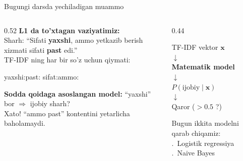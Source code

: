 \documentclass[aspectratio=169,11pt]{beamer}
\begin{document}
\begin{frame}{Bugungi darsda yechiladigan muammo}
  \begin{columns}[T]
    \begin{column}{0.52\textwidth}
      \small
      \textbf{L1 da to'xtagan vaziyatimiz:}\\[4pt]
      Sharh: ``Sifati \textbf{yaxshi}, ammo
      yetkazib berish xizmati sifati \textbf{past} edi.''\\[5pt]
      TF-IDF ning har bir so'z uchun qiymati:\\[2pt]
      \begin{tcolorbox}[warnbox]
        \footnotesize
        yaxshi:\quad past:\quad
        sifat:\quad ammo:
      \end{tcolorbox}
      \vspace{5pt}
      \textbf{Sodda qoidaga asoslangan model:} ``yaxshi'' bor $\Rightarrow$ ijobiy sharh?\\
      \alert{Xato!} ``ammo past'' kontentini yetarlicha baholamaydi.
    \end{column}
    \begin{column}{0.44\textwidth}
      \vspace{8pt}
      \begin{tcolorbox}[defbox,title=NLP yondashuvi]
        \small
        TF-IDF vektor $\mathbf{x}$\\[2pt]
        $\downarrow$\\[2pt]
        \textbf{Matematik model}\\[2pt]
        $\downarrow$\\[2pt]
        $P(\text{ijobiy}\mid\mathbf{x})$\\[2pt]
        $\downarrow$\\[2pt]
        Qaror ($>\!0.5$ ?)
      \end{tcolorbox}
      \vspace{5pt}
      \small Bugun ikkita modelni qarab chiqamiz:\\
      .\ Logistik regressiya\\
      .\ Naive Bayes
    \end{column}
  \end{columns}
\end{frame}

\end{document}

